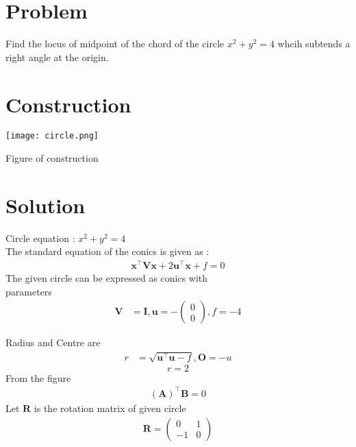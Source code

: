 \documentclass[10pt, a4paper]{article}
\title{\mytitle}
\author{\myauthor\hspace{1em}\\\contact\\FWC22062\hspace{6.5em}IITH\hspace{0.5em}\mymodule\hspace{6em}Assignment}
\newcommand{\myvec}[1]{\ensuremath{\begin{pmatrix}#1\end{pmatrix}}}
\let\vec\mathbf
\begin{document}
	\maketitle
	\tableofcontents
   \section{Problem}
  Find the locus of midpoint of the chord of the circle $x^2+y^2=4$ whcih subtends a right angle at the origin.
\section{Construction}
  \texttt{[image: circle.png]}
  	\begin{center}
  Figure of construction
  	\end{center}
  \section{Solution}

Circle equation : $x^2+y^2=4$\\
The standard equation of the conics is given as :
\begin{align}
\vec{x}^{\top}\vec{V}\vec{x}+2\vec{u}^{\top}\vec{x}+f=0
\end{align}
The given circle  can be expressed as conics with \\parameters
\begin{align}
	\vec{V} &= \vec{I}, \vec{u} = -\myvec{0 \\0}, f = -4
	\end{align}

	Radius and Centre are
	\begin{align}
	r &=\sqrt{{\vec{u}^{\top}\vec{u}}-f },\vec{O}=-u
    \end{align}
\begin{equation}
  r=2 
\end{equation}
From the figure
\begin{align}
    \vec{(A)}^{\top}\vec{B}=0
\end{align}
Let $\vec{R}$ is the rotation matrix of given circle  \\\vspace{1mm}
\begin{align}
 \vec{R} = \myvec{0 & 1 \\-1 & 0}
\end{align}
\end{document}
